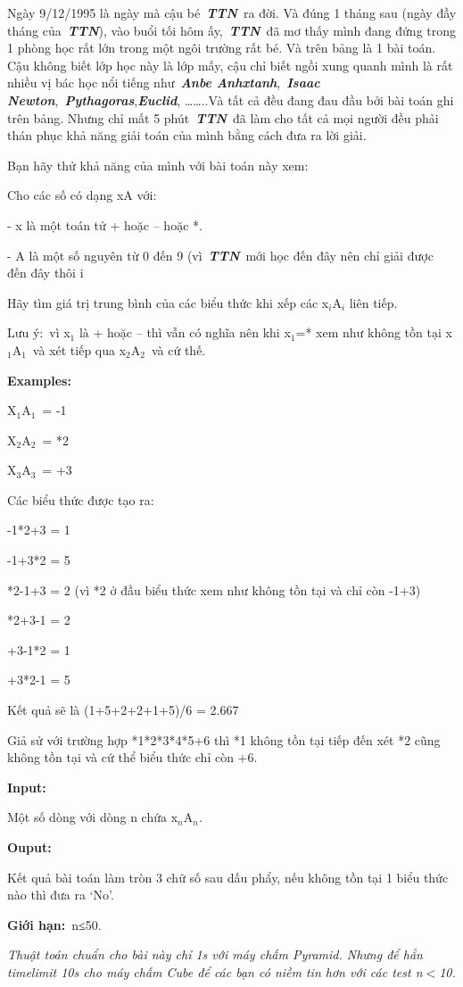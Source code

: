 

Ngày 9/12/1995 là ngày mà cậu bé \textbf{\emph{TTN}} ra đời. Và đúng 1 tháng sau (ngày đầy tháng của \textbf{\emph{TTN}}), vào buổi tối hôm ấy, \textbf{\emph{TTN}} đã mơ thấy mình đang đứng trong 1 phòng học rất lớn trong một ngôi trường rất bé. Và trên bảng là 1 bài toán. Cậu không biết lớp học này là lớp mấy, cậu chỉ biết ngồi xung quanh mình là rất nhiều vị bác học nổi tiếng như \textbf{\emph{Anbe Anhxtanh}}, \textbf{\emph{Isaac Newton}}, \textbf{\emph{Pythagoras}},\textbf{\emph{Euclid}}, ……..Và tất cả đều đang đau đầu bởi bài toán ghi trên bảng. Nhưng chỉ mất 5 phút \textbf{\emph{TTN}} đã làm cho tất cả mọi người đều phải thán phục khả năng giải toán của mình bằng cách đưa ra lời giải.

Bạn hãy thử khả năng của mình với bài toán này xem:

Cho các số có dạng xA với:

- x là một toán tử + hoặc – hoặc *.

- A là một số nguyên từ 0 đến 9 (vì \textbf{\emph{TTN}} mới học đến đây nên chỉ giải được đến đây thôi ^^)

Hãy tìm giá trị trung bình của các biểu thức khi xếp các x$_i$A$_i$ liên tiếp.

Lưu ý: vì x$_1$ là + hoặc – thì vẫn có nghĩa nên khi x$_1$=* xem như không tồn tại x$_1$A$_1$ và xét tiếp qua x$_2$A$_2$ và cứ thế.

\textbf{Examples:}

X$_1$A$_1$ = -1

X$_2$A$_2$ = *2

X$_3$A$_3$ = +3

Các biểu thức được tạo ra:

-1*2+3 = 1

-1+3*2 = 5

*2-1+3 = 2 (vì *2 ở đầu biểu thức xem như không tồn tại và chỉ còn -1+3)

*2+3-1 = 2

+3-1*2 = 1

+3*2-1 = 5

Kết quả sẽ là (1+5+2+2+1+5)/6 = 2.667

Giả sử với trường hợp *1*2*3*4*5+6 thì *1 không tồn tại tiếp đến xét *2 cũng không tồn tại và cứ thể biểu thức chỉ còn +6.

\textbf{Input:}

Một số dòng với dòng n chứa x$_n$A$_n$.

\textbf{Ouput:}

Kết quả bài toán làm tròn 3 chữ số sau dấu phẩy, nếu không tồn tại 1 biểu thức nào thì đưa ra ‘No’.

\textbf{Giới hạn:} n≤50.

\emph{Thuật toán chuẩn cho bài này chỉ 1s với máy chấm Pyramid. Nhưng để hẳn timelimit 10s cho máy chấm Cube để các bạn có niềm tin hơn với các test n$<$10.}

